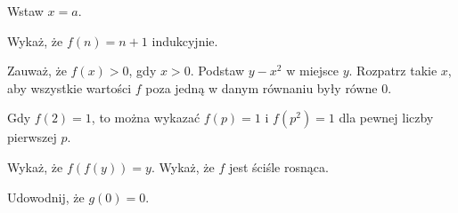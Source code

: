 
\begin{hints_list}
	\item Wstaw $x = a$.
	\item Wykaż, że $f(n) = n + 1$ indukcyjnie.
	\item Zauważ, że $f(x) > 0 $, gdy $x > 0$. Podstaw $y - x^2$ w miejsce $y$. Rozpatrz takie $x$, aby wszystkie wartości $f$ poza jedną w danym równaniu były równe 0.
	\item Gdy $f(2) = 1$, to można wykazać $f(p) = 1$ i $f(p^2) = 1$ dla pewnej liczby pierwszej $p$.
	\item Wykaż, że $f(f(y)) = y$. Wykaż, że $f$ jest ściśle rosnąca.
	\item Udowodnij, że $g(0) = 0$.
\end{hints_list}